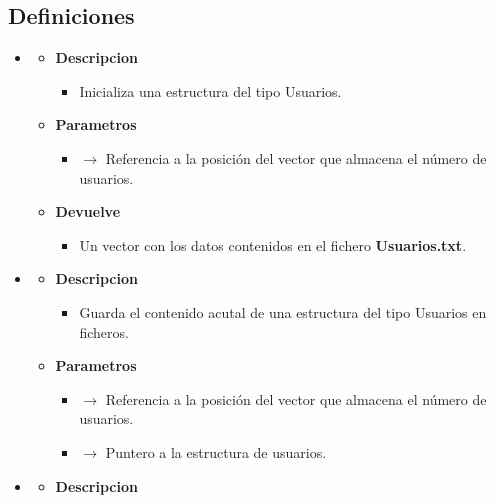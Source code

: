 \subsection{Definiciones}
\begin{itemize}
	\item {}
	\begin{itemize}
		\item \textbf{Descripcion}
        \begin{itemize}
			\item Inicializa una estructura del tipo Usuarios.
		\end{itemize}
        \item \textbf{Parametros}
		\begin{itemize}
			\item {} $\rightarrow$ Referencia a la posición del vector que almacena el número de usuarios.
		\end{itemize}
		\item \textbf{Devuelve}
		\begin{itemize}
			\item Un vector con los datos contenidos en el fichero \textbf{Usuarios.txt}.
		\end{itemize}
	\end{itemize}
	\item{}
	\begin{itemize}
		\item \textbf{Descripcion}
        \begin{itemize}
			\item Guarda el contenido acutal de una estructura del tipo Usuarios en ficheros.
		\end{itemize}
        \item \textbf{Parametros}
		\begin{itemize}
			\item {} $\rightarrow$ Referencia a la posición del vector que almacena el número de usuarios.
            \item {} $\rightarrow$ Puntero a la estructura de usuarios.
		\end{itemize}
	\end{itemize}
    \item{}
	\begin{itemize}
		\item \textbf{Descripcion}
        \begin{itemize}

\end{itemize}
\end{itemize}
\end{itemize}
